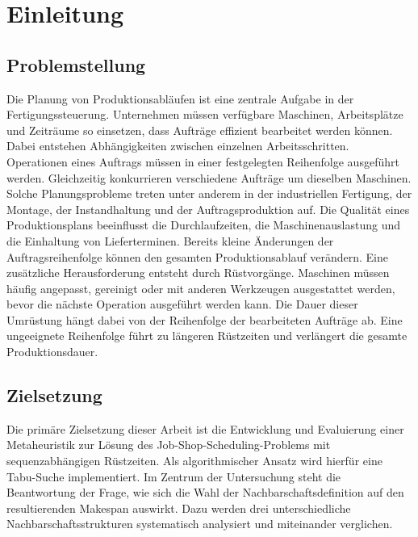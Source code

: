 \chapter{Einleitung}
\label{ch:einleitung}

\section{Problemstellung}
\label{sec:problemstellung}
Die Planung von Produktionsabläufen ist eine zentrale Aufgabe in der Fertigungssteuerung. Unternehmen müssen verfügbare Maschinen, Arbeitsplätze und Zeiträume so einsetzen, dass Aufträge effizient bearbeitet werden können. Dabei entstehen Abhängigkeiten zwischen einzelnen Arbeitsschritten. Operationen eines Auftrags müssen in einer festgelegten Reihenfolge ausgeführt werden. Gleichzeitig konkurrieren verschiedene Aufträge um dieselben Maschinen.
Solche Planungsprobleme treten unter anderem in der industriellen Fertigung, der Montage, der Instandhaltung und der Auftragsproduktion auf. Die Qualität eines Produktionsplans beeinflusst die Durchlaufzeiten, die Maschinenauslastung und die Einhaltung von Lieferterminen. Bereits kleine Änderungen der Auftragsreihenfolge können den gesamten Produktionsablauf verändern.
Eine zusätzliche Herausforderung entsteht durch Rüstvorgänge. Maschinen müssen häufig angepasst, gereinigt oder mit anderen Werkzeugen ausgestattet werden, bevor die nächste Operation ausgeführt werden kann. Die Dauer dieser Umrüstung hängt dabei von der Reihenfolge der bearbeiteten Aufträge ab. Eine ungeeignete Reihenfolge führt zu längeren Rüstzeiten und verlängert die gesamte Produktionsdauer.
\section{Zielsetzung}
\label{sec:zielsetzung}
Die primäre Zielsetzung dieser Arbeit ist die Entwicklung und Evaluierung einer Metaheuristik zur Lösung des Job-Shop-Scheduling-Problems mit sequenzabhängigen Rüstzeiten.
Als algorithmischer Ansatz wird hierfür eine Tabu-Suche implementiert.
Im Zentrum der Untersuchung steht die Beantwortung der Frage, wie sich die Wahl der Nachbarschaftsdefinition auf den resultierenden Makespan auswirkt.
Dazu werden drei unterschiedliche Nachbarschaftsstrukturen systematisch analysiert und miteinander verglichen.

